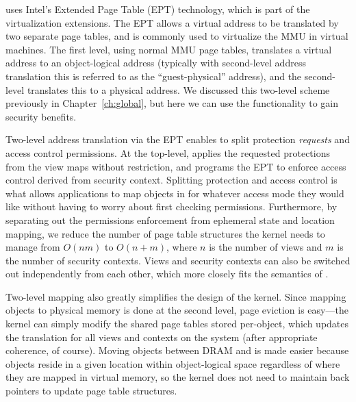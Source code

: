 \Twizzler uses Intel's Extended Page Table (EPT) technology, which is part of the virtualization
extensions. The EPT allows a virtual address to be translated by two separate page tables, and is
commonly used to virtualize the MMU in virtual machines. The first
level, using normal MMU page tables, translates a virtual address to an object-logical
address (typically with second-level address translation this is referred to as the
``guest-physical'' address), and the second-level translates this to a physical address.
We discussed this two-level scheme previously in Chapter~\ref{ch:global}, but here we can use the functionality to
gain security benefits.

Two-level address translation via the EPT enables \Twizzler to split protection \emph{requests}
and access control permissions. At the top-level, \Twizzler applies the requested protections from
the view maps without restriction, and programs the EPT to enforce access control derived from
security context. Splitting protection and access control is what allows applications to map
objects in for whatever access mode they would like without having to worry about first checking
permissions.
Furthermore, by separating out the permissions enforcement from ephemeral state and location
mapping, we reduce the number of page table structures the kernel needs to manage
from $O\left(n m\right)$ to $O\left(n + m\right)$, where $n$ is the number of views
and $m$ is the number of security contexts. Views and security contexts can also be switched out
independently from each other, which more closely fits the semantics of \Twizzler.

Two-level mapping also greatly simplifies the design of the kernel. Since mapping objects to physical memory
is done at the second level, page eviction is easy---the kernel can simply modify the shared page
tables stored per-object, which updates the translation for all views and contexts on the system
(after appropriate coherence, of course). Moving objects between DRAM and \NVM is made easier
because objects reside in a given location within object-logical space regardless of where they are
mapped in virtual memory, so the kernel does not need to maintain back pointers to update page table
structures.


